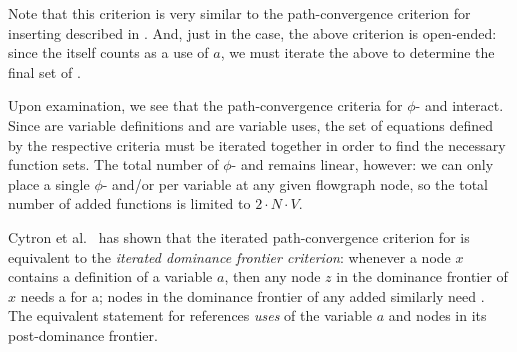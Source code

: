 Note that this criterion is very similar to the path-con\-ver\-gence
criterion for inserting  described in
\cite{appel:modern,cytron91:ssa}.  And, just in the \phifunction{}
case, the above criterion is open-ended: since the \sigfunction{}
itself counts as a use of $a$, we must iterate the above to determine
the final set of .

Upon examination, we see that the path-con\-ver\-gence criteria for $\phi$- and
 interact.  Since  are variable
definitions and  are variable uses, the set of
equations defined by the respective criteria must be iterated together 
in order to find the necessary function sets.  The total number of
$\phi$- and  remains linear, however: we can only place 
a single $\phi$- and/or \sigfunction{} per variable at any given
flowgraph node, so the total number of added functions is limited to 
$2 \cdot N \cdot V$.

Cytron et al.\ \cite{cytron91:ssa} has shown that the iterated
path-con\-ver\-gence criterion for  is equivalent to the
\textit{iterated dominance frontier criterion}: whenever a node $x$
contains a definition of a variable $a$, then any node $z$ in the
dominance frontier of $x$ needs a \phifunction{} for a; nodes in the
dominance frontier of any added \phifunction{} similarly need
.  The equivalent statement for 
references \textit{uses} of the variable $a$ and nodes in its
post-dominance frontier. 
